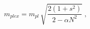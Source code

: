 \begin{equation}  \label{eqp5}
m_{plex} = m_{pl} \, \sqrt{ \frac{2(1+s^2)}{2 -\alpha N^2 }} \; ,
\end{equation}

